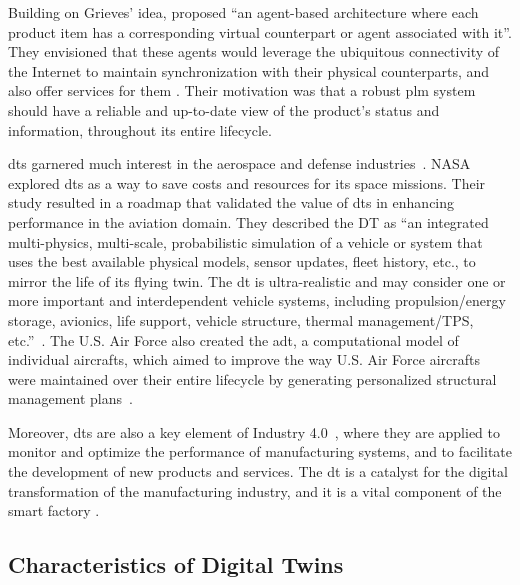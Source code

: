 Building on Grieves' idea, \textcite{framlingProductAgentsHandling2003} proposed ``an agent-based architecture where each product item has a corresponding virtual counterpart or agent associated with it''. They envisioned that these agents would leverage the ubiquitous connectivity of the Internet to maintain synchronization with their physical counterparts, and also offer services for them \parencite{framlingProductAgentsHandling2003}. Their motivation was that a robust \acrshort{plm} system should have a reliable and up-to-date view of the product's status and information, throughout its entire lifecycle.

\acrshort{dt}s garnered much interest in the aerospace and defense industries~\parencite{negriReviewRolesDigital2017}. NASA explored \acrshort{dt}s as a way to save costs and resources for its space missions. Their study resulted in a roadmap that validated the value of \acrshort{dt}s in enhancing performance in the aviation domain. They described the DT as ``an integrated multi-physics, multi-scale, probabilistic simulation of a vehicle or system that uses the best available physical models, sensor updates, fleet history, etc., to mirror the life of its flying twin. The \acrshort{dt} is ultra-realistic and may consider one or more important and interdependent vehicle systems, including propulsion/energy storage, avionics, life support, vehicle structure, thermal management/TPS, etc.''~\parencite{shaftoModelingSimulationInformation2010}. The U.S. Air Force also created the \acrfull{adt}, a computational model of individual aircrafts, which aimed to improve the way U.S. Air Force aircrafts were maintained over their entire lifecycle by generating personalized structural management plans~\parencite{tuegelAirframeDigitalTwin2012,gockelChallengesStructuralLife2012}.

Moreover, \acrshort{dt}s are also a key element of Industry 4.0~\parencite{brettelHowVirtualizationDecentralization2014,hermannDesignPrinciplesIndustrie2016,vachalekDigitalTwinIndustrial2017,negriReviewRolesDigital2017}, where they are applied to monitor and optimize the performance of manufacturing systems, and to facilitate the development of new products and services. The \acrshort{dt} is a catalyst for the digital transformation of the manufacturing industry, and it is a vital component of the smart factory \parencite{mabkhotRequirementsSmartFactory2018}.

\iffalse
    \subsection{Characteristics of Digital Twins}

